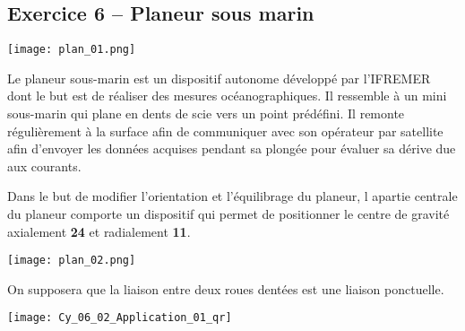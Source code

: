 \subsection*{Exercice 6 -- Planeur sous marin}


\begin{marginfigure}
\texttt{[image: plan\_01.png]}
\end{marginfigure}

Le planeur sous-marin est un dispositif autonome développé par l'IFREMER dont le but est de réaliser des mesures océanographiques. Il ressemble à un mini sous-marin qui plane en dents de scie vers un point prédéfini. Il remonte régulièrement à la surface afin de communiquer avec son opérateur par satellite afin d'envoyer les données acquises pendant sa plongée pour évaluer sa dérive due aux courants. 


Dans le but de modifier l'orientation et l'équilibrage du planeur, l apartie centrale du planeur comporte un dispositif qui permet de positionner le centre de gravité axialement \textbf{24} et radialement \textbf{11}. 


\begin{center}
\texttt{[image: plan\_02.png]}
\end{center}


\ifprof
\begin{corrige}
\end{corrige}\else\fi

On supposera que la liaison entre deux roues dentées est une liaison ponctuelle. 

\ifprof
\else
\begin{marginfigure}
\centering
\texttt{[image: Cy\_06\_02\_Application\_01\_qr]}
\end{marginfigure}
\fi


\ifprof
\begin{corrige}
\end{corrige}\else\fi


